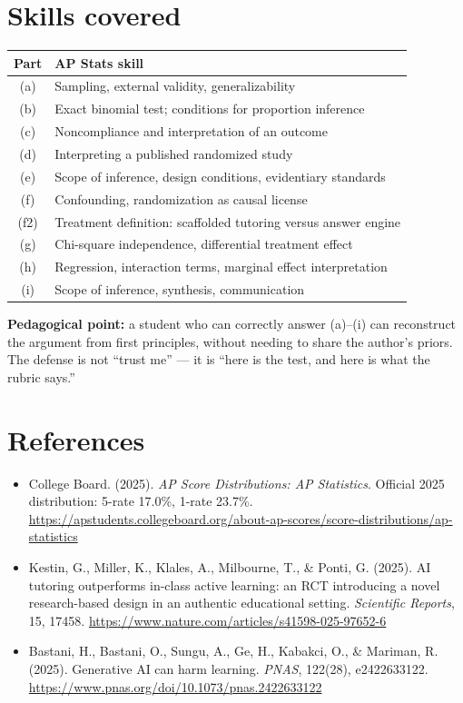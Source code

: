 \documentclass[11pt]{article}
\begin{document}
\section*{Skills covered}

\begin{center}
\small
\begin{tabular}{cl}
\toprule
Part & AP Stats skill \\
\midrule
(a) & Sampling, external validity, generalizability \\
(b) & Exact binomial test; conditions for proportion inference \\
(c) & Noncompliance and interpretation of an outcome \\
(d) & Interpreting a published randomized study \\
(e) & Scope of inference, design conditions, evidentiary standards \\
(f) & Confounding, randomization as causal license \\
(f2) & Treatment definition: scaffolded tutoring versus answer engine \\
(g) & Chi-square independence, differential treatment effect \\
(h) & Regression, interaction terms, marginal effect interpretation \\
(i) & Scope of inference, synthesis, communication \\
\bottomrule
\end{tabular}
\end{center}

\vspace{1em}
\begin{notebox}
\textbf{Pedagogical point:} a student who can correctly answer
(a)--(i) can reconstruct the argument from first principles, without
needing to share the author's priors. The defense is not ``trust me''
--- it is ``here is the test, and here is what the rubric says.''
\end{notebox}

\section*{References}
\begin{itemize}[leftmargin=*]
  \item College Board. (2025). \emph{AP Score Distributions: AP
  Statistics}. Official 2025 distribution: 5-rate 17.0\%, 1-rate
  23.7\%. \url{https://apstudents.collegeboard.org/about-ap-scores/score-distributions/ap-statistics}
  \item Kestin, G., Miller, K., Klales, A., Milbourne, T., \& Ponti,
  G. (2025). AI tutoring outperforms in-class active learning: an
  RCT introducing a novel research-based design in an authentic
  educational setting. \emph{Scientific Reports}, 15, 17458.
  \url{https://www.nature.com/articles/s41598-025-97652-6}
  \item Bastani, H., Bastani, O., Sungu, A., Ge, H., Kabakci, O., \&
  Mariman, R. (2025). Generative AI can harm learning. \emph{PNAS},
  122(28), e2422633122.
  \url{https://www.pnas.org/doi/10.1073/pnas.2422633122}
\end{itemize}
\end{document}
